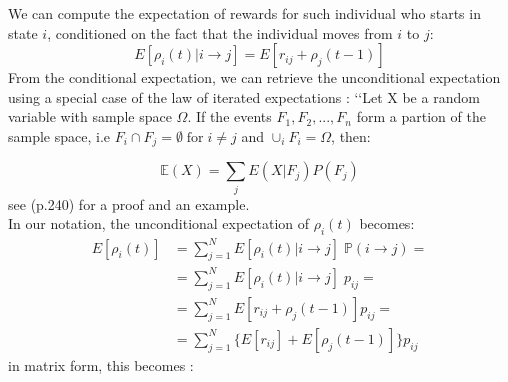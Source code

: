 \documentclass[\main/main.tex]{subfiles}
\begin{document}
\begin{figure}[H]
\centering
{}
\caption{}
\label{fig:}
\end{figure}




\noindent We can compute the expectation of rewards for such individual who starts in state $i$, conditioned on the fact that the individual moves from $i$ to $j$:
    \begin{equation}
        E[ \rho_i(t) | i \rightarrow j] = E[ r_{ij} + \rho_j(t-1) ]
    \end{equation}
From the conditional expectation, we can retrieve the unconditional expectation using a special case of the law of iterated expectations \citep{Grinstead1997}: \lq\lq Let X be a random variable with sample space $\Omega$. If the events $F_1, F_2, ..., F_n$ form a partion of the sample space, i.e $F_i \cap F_j = \emptyset \; \text{for} \; i \neq j$ and $\cup_i F_i = \Omega$, then:

\begin{equation}
\mathds{E} (X) = \sum_j E(X | F_j) P(F_j)
\end{equation}
see \cite{Grinstead1997} (p.240) for a proof and an example.\\



\noindent In our notation, the unconditional expectation of $ \rho_i(t) $ becomes:
    \begin{equation}\label{unconditional}
    \begin{split}
         E[ \rho_i(t)] &= \sum_{j=1}^N E[\rho_i(t) | i \rightarrow j] \; \mathds{P}( i \rightarrow j) = \\
         &= \sum_{j=1}^N  E[\rho_i(t) | i \rightarrow j]\; p_{ij} =\\
         &= \sum_{j=1}^N    E[ r_{ij} + \rho_j(t-1)]  p_{ij} = \\
         &= \sum_{j=1}^N  \{  E[ r_{ij}] + E[\rho_j(t-1)]\}  p_{ij}
    \end{split}
    \end{equation}
in matrix form, this becomes \citep{Caswell2011}:
\end{document}
